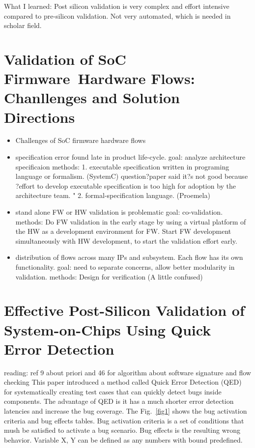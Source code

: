 \documentclass[conference]{IEEEtran}
\begin{document}
What I learned:
Post silicon validation is very complex and effort intensive compared to pre-silicon validation. Not very automated, which is needed in scholar field.


\section{Validation of SoC Firmware~Hardware Flows: Chanllenges and Solution Directions ~\cite{fw}}
\begin{itemize}
	\item Challenges of SoC firmware hardware flows
	\item specification error found late in product life-cycle.
		goal: analyze architecture specificaion
		methods: 1. executable specification written in programing language or formalism. (SystemC)
				question?paper said it?s not good because ?effort to develop executable specification is too high for adoption by the 						architecture team. "
				2. formal-specification language. (Proemela)

	\item stand alone FW or HW validation is problematic
		goal: co-validation. 
		methods: Do FW validation in the early stage by using a virtual platform of the HW as a development environment for FW. Start FW 			development simultaneously with HW development, to start the validation effort early.

	\item distribution of flows across many IPs and subsystem. Each flow has its own functionality.
		goal: need to separate concerns, allow better modularity in validation.
		methods: Design for verification
				(A little confused)
\end{itemize}

\section{Effective Post-Silicon Validation of System-on-Chips Using Quick Error Detection ~\cite{qed} }

{\color{red} reading: ref 9 about priori and 46 for algorithm about software signature and flow checking}
This paper introduced a method called Quick Error Detection (QED) for systematically creating test cases that can quickly detect bugs inside components.
The advantage of QED is it has a much shorter error detection latencies and increase the bug coverage.
The Fig.~\ref{fig1} shows the bug activation criteria and bug effects tables. Bug activation criteria is a set of conditions that mush be satisfied to activate a bug scenario. Bug effects is the resulting wrong behavior. Variable X, Y can be defined as any numbers with bound predefined.
\end{document}
